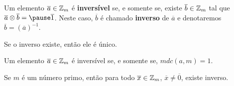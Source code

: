 \documentclass{beamer}
\begin{document}
    \begin{frame}
        \begin{definicao}
            Um elemento $\overline{a} \in \mathbb{Z}_m$ é \textbf{inversível} \pause se, e somente se, existe $\overline{b} \in \mathbb{Z}_m$ \pause tal que $\overline{a} \otimes \overline{b} = \pause \overline1$. \pause Neste caso, $\overline{b}$ \pause é chamado \textbf{inverso} de $\overline{a}$ \pause e denotaremos $\overline{b} = (\overline{a})^{-1}$.\pause
        \end{definicao}

        \begin{proposicao}
            Se o inverso existe, \pause então ele é único.
        \end{proposicao}
    \end{frame}

    \begin{frame}
        \begin{proposicao}
            Um elemento $\overline{a} \in \mathbb{Z}_m$ é \pause inversível \pause se, e somente se, $mdc(a,m) = 1$.\pause
        \end{proposicao}

        \begin{corolario}
            Se $m$ é um número primo, \pause então para todo $\overline{x} \in \mathbb{Z}_m$, \pause $\overline{x} \ne \overline{0}$, \pause existe inverso.
        \end{corolario}
    \end{frame}
\end{document}
